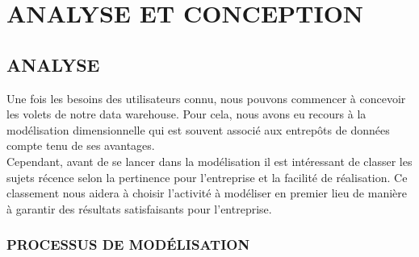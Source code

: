 \chapter{ANALYSE ET CONCEPTION}

\section{ANALYSE}


Une fois les besoins des utilisateurs connu, nous pouvons commencer à concevoir les volets de notre data warehouse. Pour cela, nous avons eu recours à la modélisation dimensionnelle qui est souvent associé aux entrepôts de données compte tenu de ses avantages.\\

Cependant, avant de se lancer dans la modélisation il est intéressant de classer les sujets récence selon la pertinence pour l’entreprise et la facilité de réalisation. Ce classement nous aidera à choisir l’activité à modéliser en premier lieu de manière à garantir des résultats satisfaisants pour l’entreprise.\\

\subsection{PROCESSUS DE MODÉLISATION}
 
